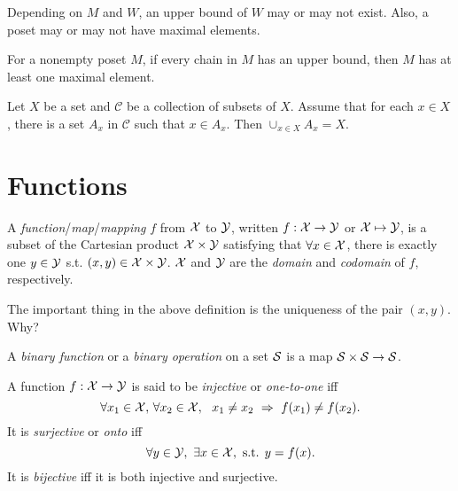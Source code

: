 \begin{rem}
  Depending on $M$ and $W$,
  an upper bound of $W$ may or may not exist.
  Also,
  a poset may or may not have maximal elements.
\end{rem}

\begin{axm}
  \label{axm:ZornLemm}
  For a nonempty poset $M$,
  if every chain in $M$ has an upper bound,
  then $M$ has at least one maximal element.
\end{axm}

\begin{lem}
  \label{lem:UnionLemma}
  Let $X$ be a set and $\mathcal{C}$ be a collection of subsets of $X$.
  Assume that for each $x\in X$,
  there is a set $A_x$ in $\mathcal{C}$
  such that $x\in A_x$. Then $\cup_{x\in X}A_x=X$. 
\end{lem}


\section{Functions}
\label{sec:functions}

\begin{defn}
  A \emph{function}/\emph{map}/\emph{mapping} $f$
  from ${\cal X}$ to ${\cal Y}$,
  written $f: {\cal X}\rightarrow {\cal Y}$ or ${\cal X}\mapsto {\cal Y}$,
  is a subset of the Cartesian product ${\cal X} \times {\cal Y}$
  satisfying that
  $\forall x\in {\cal X}$,
  there is exactly one $y\in {\cal Y}$
  s.t. $(x,y)\in {\cal X}\times {\cal Y}$.
  ${\cal X}$ and ${\cal Y}$ are
  the \emph{domain} and \emph{codomain} of $f$,
  respectively.
\end{defn}

\begin{rem}
The important thing in the above definition
 is the uniqueness of the pair $(x,y)$.
Why?
\end{rem}

\begin{defn}
  A \emph{binary function} or a \emph{binary operation} on a set ${\cal S}$
  is a map \mbox{${\cal S}\times{\cal S} \rightarrow {\cal S}$}.
\end{defn}

\begin{defn}
  A function $f:{\cal X}\rightarrow {\cal Y}$ is said to be
  \emph{injective} or \emph{one-to-one} iff
   \begin{equation}
     \forall x_1\in {\cal X},\, \forall x_2\in {\cal X},\ \ 
     x_1\ne x_2 \ \Rightarrow\ f(x_1)\ne f(x_2).
   \end{equation}
  It is \emph{surjective} or \emph{onto} iff
   \begin{equation}
     \forall y\in {\cal Y},\ \exists x\in {\cal X}, \text{ s.t. }
     y=f(x).
   \end{equation}
  It is \emph{bijective} iff it is both injective and surjective.
\end{defn}

